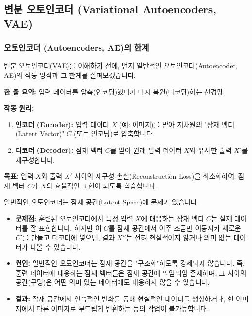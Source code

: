 \documentclass[11pt,a4paper]{article}
\theoremstyle{definition}
\begin{document}
\newpage
\subsection{변분 오토인코더 (Variational Autoencoders, VAE)}

\subsubsection{오토인코더 (Autoencoders, AE)의 한계}
변분 오토인코더(VAE)를 이해하기 전에, 먼저 일반적인 오토인코더(Autoencoder, AE)의 작동 방식과 그 한계를 살펴보겠습니다.

\begin{tcolorbox}[conceptbox, title=일반적인 오토인코더 (AE)]
\textbf{한 줄 요약:} 입력 데이터를 압축(인코딩)했다가 다시 복원(디코딩)하는 신경망.

\textbf{작동 원리:}
\begin{enumerate}
    \item \textbf{인코더 (Encoder):} 입력 데이터 $X$ (예: 이미지)를 받아 저차원의 "잠재 벡터(Latent Vector)" $C$ (또는 인코딩)로 압축합니다.
    \item \textbf{디코더 (Decoder):} 잠재 벡터 $C$를 받아 원래 입력 데이터 $X$와 유사한 출력 $X'$를 재구성합니다.
\end{enumerate}
\textbf{목표:} 입력 $X$와 출력 $X'$ 사이의 재구성 손실(Reconstruction Loss)을 최소화하여, 잠재 벡터 $C$가 $X$의 효율적인 표현이 되도록 학습합니다.
\end{tcolorbox}

\begin{tcolorbox}[warningbox, title=오토인코더의 잠재 공간 문제: "구멍(Holes)"]
일반적인 오토인코더는 잠재 공간(Latent Space)에 문제가 있습니다.
\begin{itemize}
    \item \textbf{문제점:} 훈련된 오토인코더에서 특정 입력 $X$에 대응하는 잠재 벡터 $C$는 실제 데이터를 잘 표현합니다. 하지만 이 $C$를 잠재 공간에서 아주 조금만 이동시켜 새로운 $C'$를 만들고 디코더에 넣으면, 결과 $X''$는 전혀 현실적이지 않거나 의미 없는 데이터가 나올 수 있습니다.
    \item \textbf{원인:} 일반적인 오토인코더는 잠재 공간을 "구조화"하도록 강제되지 않습니다. 즉, 훈련 데이터에 대응하는 잠재 벡터들은 잠재 공간에 띄엄띄엄 존재하며, 그 사이의 공간(구멍)은 어떤 의미 있는 데이터에도 대응하지 않을 수 있습니다.
    \item \textbf{결과:} 잠재 공간에서 연속적인 변화를 통해 현실적인 데이터를 생성하거나, 한 이미지에서 다른 이미지로 부드럽게 변환하는 등의 작업이 불가능합니다.
\end{itemize}
\end{tcolorbox}
\end{document}
